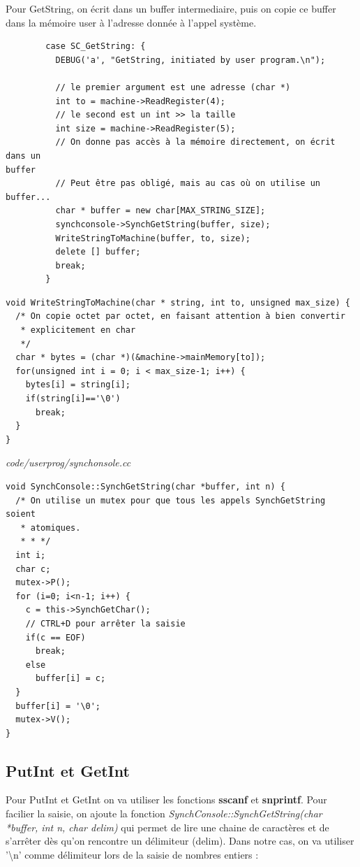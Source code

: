 \documentclass[a4paper,10pt]{article}
\begin{document}
Pour GetString, on écrit dans un buffer intermediaire, puis on copie ce buffer
dans la mémoire user à l'adresse donnée à l'appel système.

\begin{lstlisting}
        case SC_GetString: {
          DEBUG('a', "GetString, initiated by user program.\n");

          // le premier argument est une adresse (char *)
          int to = machine->ReadRegister(4);
          // le second est un int >> la taille
          int size = machine->ReadRegister(5);
          // On donne pas accès à la mémoire directement, on écrit dans un
buffer
          // Peut être pas obligé, mais au cas où on utilise un buffer...
          char * buffer = new char[MAX_STRING_SIZE];
          synchconsole->SynchGetString(buffer, size);
          WriteStringToMachine(buffer, to, size);
          delete [] buffer;
          break;
        }
\end{lstlisting}


\begin{lstlisting}
void WriteStringToMachine(char * string, int to, unsigned max_size) {
  /* On copie octet par octet, en faisant attention à bien convertir
   * explicitement en char
   */
  char * bytes = (char *)(&machine->mainMemory[to]);
  for(unsigned int i = 0; i < max_size-1; i++) {
    bytes[i] = string[i];
    if(string[i]=='\0')
      break;
  }
}
\end{lstlisting}

\textit{code/userprog/synchonsole.cc}
\begin{lstlisting}
void SynchConsole::SynchGetString(char *buffer, int n) {
  /* On utilise un mutex pour que tous les appels SynchGetString soient
   * atomiques.
   * * */
  int i;
  char c;
  mutex->P();
  for (i=0; i<n-1; i++) {
    c = this->SynchGetChar();
    // CTRL+D pour arrêter la saisie
    if(c == EOF)
      break;
    else
      buffer[i] = c;
  }
  buffer[i] = '\0';
  mutex->V();
}
\end{lstlisting}

\subsection{PutInt et GetInt}

Pour PutInt et GetInt on va utiliser les fonctions \textbf{sscanf} et
\textbf{snprintf}. Pour facilier la saisie, on ajoute la fonction
\textit{SynchConsole::SynchGetString(char *buffer, int n, char delim)} qui
permet de lire une chaine de caractères et de s'arrêter dès qu'on rencontre un
délimiteur (delim). Dans notre cas, on va utiliser '\textbackslash{n}'
comme délimiteur lors de la saisie de nombres entiers :
\end{document}
